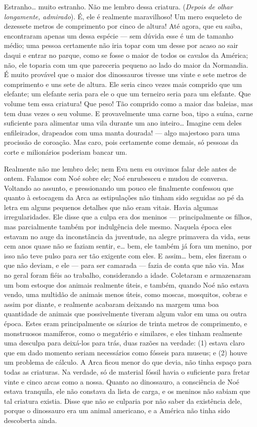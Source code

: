 Estranho\ldots{} muito estranho. Não me lembro dessa criatura. (\textit{Depois de olhar longamente, admirado}).
É, ele é realmente maravilhoso! Um mero esqueleto de dezessete metros de comprimento por
cinco de altura! Até agora, que eu saiba, encontraram apenas um dessa espécie --- sem
dúvida esse é um de tamanho médio; uma pessoa certamente não iria topar com um
desse por acaso ao sair daqui e entrar no parque, como se fosse o maior de todos
os cavalos da América; não, ele toparia com um que pareceria pequeno ao lado do
maior da Normandia. É muito provável que o maior dos dinossauros tivesse uns vinte e sete
metros de comprimento e uns sete de altura. Ele seria cinco vezes mais comprido que
um elefante; um elefante seria para ele o que um terneiro seria para um elefante.
Que volume tem essa criatura! Que peso! Tão comprido como a maior das baleias, mas
tem duas vezes o seu volume. E provavelmente uma carne boa, tipo a suína, carne
suficiente para alimentar uma vila durante um ano inteiro\ldots{} Imagine cem deles
enfileirados, drapeados com uma manta dourada! --- algo majestoso para uma procissão
de coroação. Mas caro, pois certamente come demais, só pessoas da corte e
milionários poderiam bancar um.

Realmente não me lembro dele; nem Eva nem eu ouvimos falar dele antes de ontem.
Falamos com Noé sobre ele; Noé enrubesceu e mudou de conversa. Voltando ao
assunto, e pressionando um pouco ele finalmente confessou que quanto à
estocagem da Arca as estipulações não tinham sido seguidas ao pé da letra em alguns
pequenos detalhes que não eram vitais. Havia algumas irregularidades. Ele disse
que a culpa era dos meninos --- principalmente os filhos, mas parcialmente também
por indulgência dele mesmo. Naquela época eles estavam no auge da inconstância da
juventude, na alegre primavera da vida, seus cem anos quase não se faziam
sentir, e\ldots{} bem, ele também já fora um menino, por isso não teve pulso para ser
tão exigente com eles. E assim\ldots{} bem, eles fizeram o que não deviam,
e ele --- para ser camarada --- fazia de conta que não via. Mas no geral foram
fiéis ao trabalho, considerando a idade. Coletaram e armazenaram um bom
estoque dos animais realmente úteis, e também, quando Noé não estava vendo, uma
multidão de animais menos úteis, como moscas, mosquitos, cobras e assim por
diante, e realmente acabaram deixando na margem uma boa quantidade de animais que
possivelmente tiveram algum valor em uma ou outra época. Estes
eram principalmente os sáurios de trinta metros de comprimento, e monstruosos
mamíferos, como o megatério e similares, e eles tinham realmente uma desculpa para
deixá-los para trás, duas razões na verdade: (1) estava claro que em dado momento
seriam necessários como fósseis para museus; e (2) houve um problema de cálculo. A
Arca ficou menor do que devia, não tinha espaço para todas as
criaturas. Na verdade, só de material fóssil havia o suficiente para fretar vinte e cinco
arcas como a nossa. Quanto ao dinossauro, a consciência de Noé estava tranquila,
ele não constava da lista de carga, e os meninos não sabiam que
tal criatura existia. Disse que não se culparia por não saber da existência dele,
porque o dinossauro era um animal americano, e a América não tinha sido descoberta
ainda.

